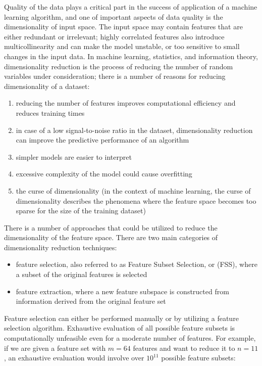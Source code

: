 Quality of the data plays a critical part in the success of application of a machine learning algorithm, and one of important aspects of data quality is the dimensionality of input space.
The input space may contain features that are either redundant or irrelevant;
highly correlated features also introduce multicollinearity and can make the model unstable, or too sensitive to small changes in the input data.
In machine learning, statistics, and information theory, dimensionality reduction is the process of reducing the number of random variables under consideration;
there is a number of reasons for reducing dimensionality of a dataset:

\begin{enumerate}
    \item reducing the number of features improves computational efficiency and reduces training times
    \item in case of a low signal-to-noise ratio in the dataset, dimensionality reduction can improve the predictive performance of an algorithm\cite{RaschkaMirjalili2017}
    \item simpler models are easier to interpret\cite{James2013}
    \item excessive complexity of the model could cause overfitting\cite{RaschkaMirjalili2017}
    \item the curse of dimensionality\cite{Bellman1954} (in the context of machine learning, the curse of dimensionality describes the phenomena where the feature space becomes too sparse for the size of the training dataset)\cite{RaschkaMirjalili2017}
\end{enumerate}

There is a number of approaches that could be utilized to reduce the dimensionality of the feature space.
There are two main categories of dimensionality reduction techniques:
\begin{itemize}
    \item feature selection, also referred to as Feature Subset Selection, or (FSS), where a subset of the original features is selected
    \item feature extraction, where a new feature subspace is constructed from information derived from the original feature set
\end{itemize}

Feature selection can either be performed manually or by utilizing a feature selection algorithm.
Exhaustive evaluation of all possible feature subsets is computationally unfeasible even for a moderate number of features.
For example, if we are given a feature set with $m = 64$ features and want to reduce it to $n = 11$, an exhaustive evaluation would involve over $10^{11}$ possible feature subsets:

